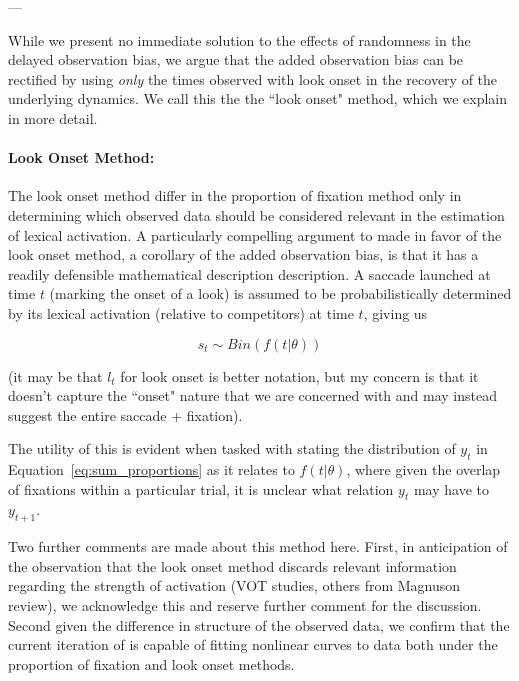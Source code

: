 ---

While we present no immediate solution to the effects of randomness in the delayed observation bias, we argue that the added observation bias can be rectified by using \textit{only} the times observed with look onset in the recovery of the underlying dynamics. We call this the the ``look onset" method, which we explain in more detail.




\paragraph{Look Onset Method:} The look onset method differ in the proportion of fixation method only in determining which observed data should be considered relevant in the estimation of lexical activation. A particularly compelling argument to made in favor of the look onset method, a corollary of the added observation bias, is that it has a readily defensible mathematical description description. A saccade launched at time $t$ (marking the onset of a look) is assumed to be probabilistically determined by its lexical activation (relative to competitors) at time $t$, giving us

\begin{equation} \label{eq:saccade_dist}
s_t \sim Bin(f(t| \theta))
\end{equation}

(it may be that $l_t$ for look onset is better notation, but my concern is that it doesn't capture the ``onset" nature that we are concerned with and may instead suggest the entire saccade + fixation).

The utility of this is evident when tasked with stating the distribution of $y_t$ in Equation~\ref{eq:sum_proportions} as it relates to $f(t|\theta)$, where given the overlap of fixations within a particular trial, it is unclear what relation $y_t$ may have to $y_{t+1}$. 

Two further comments are made about this method here. First, in anticipation of the observation that the look onset method discards relevant information regarding the strength of activation (VOT studies, others from Magnuson review), we acknowledge this and reserve further comment for the discussion. Second given the difference in structure of the observed data, we confirm that the current iteration of  is capable of fitting nonlinear curves to data both under the proportion of fixation and look onset methods.



